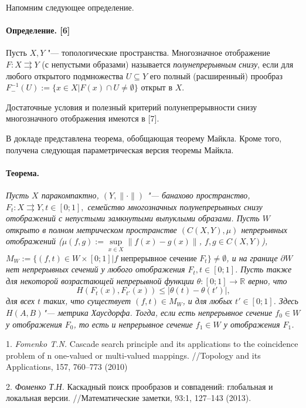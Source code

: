 Напомним следующее определение.

\paragraph{Определение. [6]} Пусть $X,Y$ "--- топологические пространства. Многозначное отображение $F: X\rightrightarrows Y$ (с непустыми образами) называется {\it полунепрерывным снизу}, если для любого открытого подмножества  $U\subseteq Y$ его полный (расширенный) прообраз $F^{-1}_{-}(U):=\{x\in X | F(x)\cap U\ne \emptyset\}$ открыт в $X$.

Достаточные условия и полезный критерий полунепрерывности снизу многозначного отображения имеются в  [7].

В докладе представлена теорема, обобщающая теорему Майкла. Кроме того, получена следующая параметрическая версия теоремы Майкла.

\paragraph{Теорема.}
{\it Пусть $X$ паракомпактно, $(Y,\|\cdot \|)$ "--- банахово пространство, $F_{t}: X\rightrightarrows Y, t\in [0;1],$ семейство многозначных полунепрерывных снизу отображений с непустыми замкнутыми выпуклыми образами. Пусть $W$  открыто в полном метрическом пространстве $(C(X,Y),\mu)$ непрерывных отображений ($\mu(f,g):=\mathop{\sup}\limits_{x\in X}\|f(x)-g(x)\|$, $f,g\in C(X,Y)$), $M_{W}:=\{(f,t)\in W\times [0;1] | f \mbox{ непрерывное сечение } F_{t}\}\ne \emptyset$, и на границе $\partial W$ нет непрерывных сечений у любого отображения $F_{t}, t\in [0;1]$. Пусть также для некоторой возрастающей непрерывной функции $\theta: [0;1]\to \mathbb R$ верно, что
$$
H(F_{t}(x),F_{t'}(x))\le|\theta(t)-\theta(t')|,
$$
для всех $t$ таких, что существует $(f,t)\in M_{W}$, и для любых $t'\in [0;1]$. Здесь $H(A,B)$"--- метрика Хаусдорфа. Тогда, если есть непрерывное сечение $f_{0}\in W$ у отображения $F_{0}$, то есть и непрерывное сечение $f_{1}\in W$ у отображения $F_{1}$.}

\litlist

1.
{\it Fomenko T.N.} Cascade search principle and its applica\-ti\-ons to the
coincidence problem of n one-valued or multi-valued mappings. //Topology and its Applications, 157, 760--773 (2010)

2.
{\it Фоменко Т.Н.} Каскадный поиск прообразов и совпадений: глобальная и
локальная версии. //Математические заметки,  93:1, 127--143 (2013).

